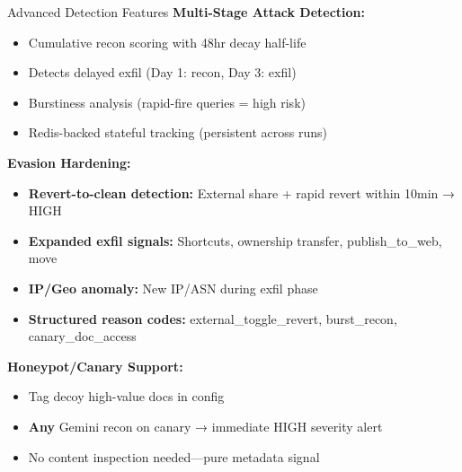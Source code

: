 \documentclass[aspectratio=169]{beamer}
\begin{document}
\begin{frame}{Advanced Detection Features}
\textbf{Multi-Stage Attack Detection:}
\begin{itemize}
    \item Cumulative recon scoring with 48hr decay half-life
    \item Detects delayed exfil (Day 1: recon, Day 3: exfil)
    \item Burstiness analysis (rapid-fire queries = high risk)
    \item Redis-backed stateful tracking (persistent across runs)
\end{itemize}

\vspace{1em}

\textbf{Evasion Hardening:}
\begin{itemize}
    \item \textbf{Revert-to-clean detection:} External share + rapid revert within 10min → HIGH
    \item \textbf{Expanded exfil signals:} Shortcuts, ownership transfer, publish\_to\_web, move
    \item \textbf{IP/Geo anomaly:} New IP/ASN during exfil phase
    \item \textbf{Structured reason codes:} external\_toggle\_revert, burst\_recon, canary\_doc\_access
\end{itemize}

\vspace{1em}

\textbf{Honeypot/Canary Support:}
\begin{itemize}
    \item Tag decoy high-value docs in config
    \item \textbf{Any} Gemini recon on canary → immediate HIGH severity alert
    \item No content inspection needed—pure metadata signal
\end{itemize}
\end{frame}
\end{document}
